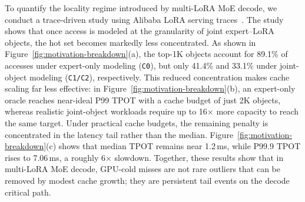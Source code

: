 \documentclass[sigplan,anonymous,review,nonacm]{acmart}
\begin{document}
To quantify the locality regime introduced by multi-LoRA MoE decode, we conduct a trace-driven study using Alibaba LoRA serving traces~\cite{lin2025understanding}. The study shows that once access is modeled at the granularity of joint expert--LoRA objects, the hot set becomes markedly less concentrated. As shown in Figure~\ref{fig:motivation-breakdown}(a), the top-1K objects account for 89.1\% of accesses under expert-only modeling (\texttt{C0}), but only 41.4\% and 33.1\% under joint-object modeling (\texttt{C1/C2}), respectively. This reduced concentration makes cache scaling far less effective: in Figure~\ref{fig:motivation-breakdown}(b), an expert-only oracle reaches near-ideal P99 TPOT with a cache budget of just 2K objects, whereas realistic joint-object workloads require up to 16$\times$ more capacity to reach the same target. Under practical cache budgets, the remaining penalty is concentrated in the latency tail rather than the median. Figure~\ref{fig:motivation-breakdown}(c) shows that median TPOT remains near 1.2\,ms, while P99.9 TPOT rises to 7.06\,ms, a roughly 6$\times$ slowdown. Together, these results show that in multi-LoRA MoE decode, GPU-cold misses are not rare outliers that can be removed by modest cache growth; they are persistent tail events on the decode critical path.

\end{document}
